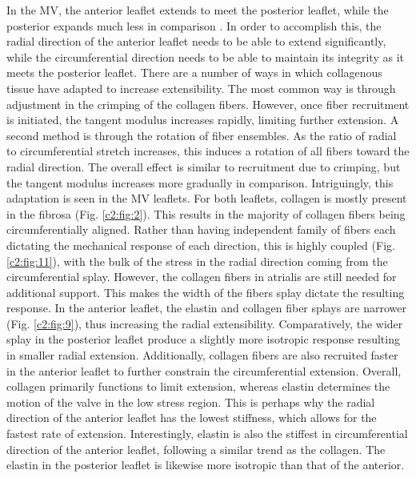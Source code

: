     In the MV, the anterior leaflet extends to meet the posterior leaflet, while the posterior expands much less in comparison \cite{amini_vivo_2012}\cite{rausch_vivo_2011}. In order to accomplish this, the radial direction of the anterior leaflet needs to be able to extend significantly, while the circumferential direction needs to be able to maintain its integrity as it meets the posterior leaflet. There are a number of ways in which collagenous tissue have adapted to increase extensibility. The most common way is through adjustment in the crimping of the collagen fibers. However, once fiber recruitment is initiated, the tangent modulus increases rapidly, limiting further extension. A second method is through the rotation of fiber ensembles. As the ratio of radial to circumferential stretch increases, this induces a rotation of all fibers toward the radial direction. The overall effect is similar to recruitment due to crimping, but the tangent modulus increases more gradually in comparison. Intriguingly, this adaptation is seen in the MV leaflets. For both leaflets, collagen is mostly present in the fibrosa (Fig. \ref{c2:fig:2}). This results in the majority of collagen fibers being circumferentially aligned. Rather than having independent family of fibers each dictating the mechanical response of each direction, this is highly coupled (Fig. \ref{c2:fig:11}), with the bulk of the stress in the radial direction coming from the circumferential splay. However, the collagen fibers in atrialis are still needed for additional support. This makes the width of the fibers splay dictate the resulting response. In the anterior leaflet, the elastin and collagen fiber splays are narrower (Fig. \ref{c2:fig:9}), thus increasing the radial extensibility. Comparatively, the wider splay in the posterior leaflet produce a slightly more isotropic response resulting in smaller radial extension. Additionally, collagen fibers are also recruited faster in the anterior leaflet to further constrain the circumferential extension. Overall, collagen primarily functions to limit extension, whereas elastin determines the motion of the valve in the low stress region. This is perhaps why the radial direction of the anterior leaflet has the lowest stiffness, which allows for the fastest rate of extension. Interestingly, elastin is also the stiffest in circumferential direction of the anterior leaflet, following a similar trend as the collagen. The elastin in the posterior leaflet is likewise more isotropic than that of the anterior.
    
    
    
